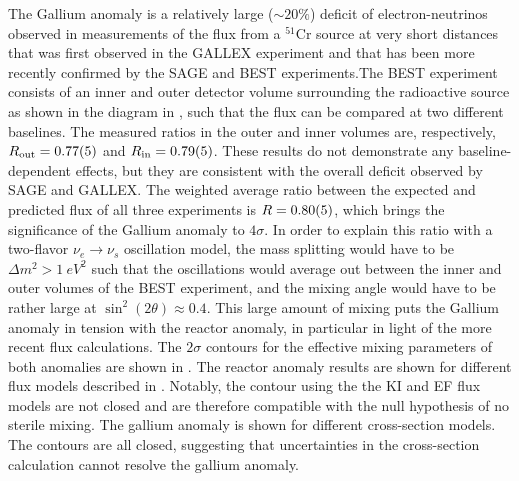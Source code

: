 The Gallium anomaly is a relatively large ($\sim20\%$) deficit of electron-neutrinos observed in measurements of the flux from a $^{51}\mathrm{Cr}$ source at very short distances that was first observed in the GALLEX experiment\cite{gallex:1998} and that has been more recently confirmed by the SAGE and BEST experiments\cite{Barinov_2022,Abdurashitov_2006}.The BEST experiment consists of an inner and outer detector volume surrounding the radioactive source as shown in the diagram in , such that the flux can be compared at two different baselines. The measured ratios in the outer and inner volumes are, respectively, $R_\mathrm{out} = \num{0.77+-0.05}$ and $R_\mathrm{in} = \num{0.79+-0.05}$. These results do not demonstrate any baseline-dependent effects, but they are consistent with the overall deficit observed by SAGE and GALLEX. The weighted average ratio between the expected and predicted flux of all three experiments is $R=\num{0.8+-0.05}$, which brings the significance of the Gallium anomaly to $4\sigma$. In order to explain this ratio with a two-flavor $\nu_e \rightarrow \nu_s$ oscillation model, the mass splitting would have to be $\Delta m^2 > \SI{1}{eV^2}$ such that the oscillations would average out between the inner and outer volumes of the BEST experiment, and the mixing angle would have to be rather large at $\sin^2(2\theta)\approx 0.4$. This large amount of mixing puts the Gallium anomaly in tension with the reactor anomaly, in particular in light of the more recent flux calculations. The $2\sigma$ contours for the effective mixing parameters of both anomalies are shown in . The reactor anomaly results are shown for different flux models described in \cite{Giunti_2022}. Notably, the contour using the the KI and EF flux models are not closed and are therefore compatible with the null hypothesis of no sterile mixing. The gallium anomaly is shown for different cross-section models. The contours are all closed, suggesting that uncertainties in the cross-section calculation cannot resolve the gallium anomaly. 
